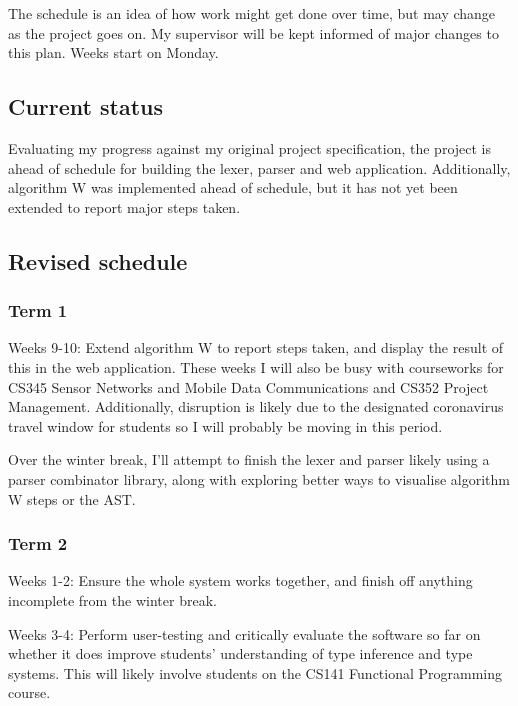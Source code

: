 \documentclass[a4paper,fleqn,12pt]{article}
\begin{document}
The schedule is an idea of how work might get done over time, but may change as the project goes on. My supervisor will be kept informed of major changes to this plan. Weeks start on Monday.

\subsection{Current status}\label{id:h.7j9eipb829lw}

Evaluating my progress against my original project specification, the project is ahead of schedule for building the lexer, parser and web application. Additionally, algorithm W was implemented ahead of schedule, but it has not yet been extended to report major steps taken.

\subsection{Revised schedule}\label{id:h.p9vfbpk6rnb6}

\subsubsection{Term 1}\label{id:h.p2x8af4pn3a5}

Weeks 9-10: Extend algorithm W to report steps taken, and display the result of this in the web application. These weeks I will also be busy with courseworks for CS345 Sensor Networks and Mobile Data Communications and CS352 Project Management. Additionally, disruption is likely due to the designated coronavirus travel window for students so I will probably be moving in this period.

Over the winter break, I’ll attempt to finish the lexer and parser likely using a parser combinator library, along with exploring better ways to visualise algorithm W steps or the AST.

\subsubsection{Term 2}\label{id:h.5axy8qlqt2n8}

Weeks 1-2: Ensure the whole system works together, and finish off anything incomplete from the winter break.

Weeks 3-4: Perform user-testing and critically evaluate the software so far on whether it does improve students’ understanding of type inference and type systems. This will likely involve students on the CS141 Functional Programming course.
\end{document}
